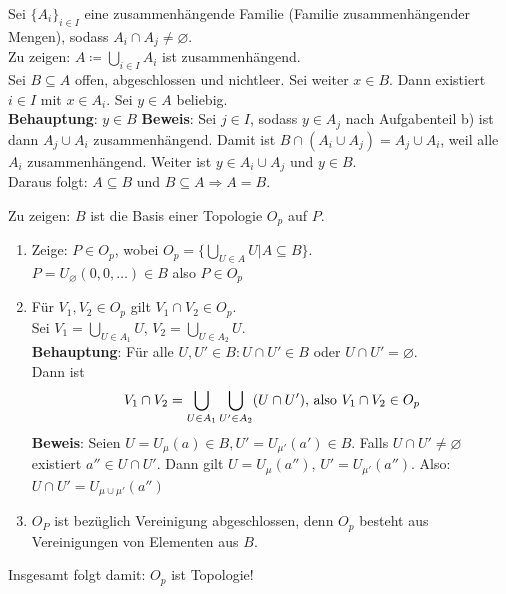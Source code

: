 \begin{problem*}[1c]
  Sei \( {\{ A_i \}}_{i \in I} \) eine zusammenhängende Familie (Familie zusammenhängender Mengen), sodass 
  \( A_i \cap A_j \neq \varnothing \). \\ 
  Zu zeigen: \( A \coloneqq \bigcup_{i \in I} A_i \) ist zusammenhängend. \\
  Sei \( B \subseteq A \) offen, abgeschlossen und nichtleer. Sei weiter \( x \in B \). Dann existiert \( i \in I \) mit
  \( x \in A_i \). Sei \( y \in A \) beliebig. \\
  \textbf{Behauptung}: \( y \in B \)
  \textbf{Beweis}: Sei \( j \in I \), sodass \( y \in A_j \) nach Aufgabenteil b) ist dann \( A_j \cup A_i \) zusammenhängend. Damit ist \( B \cap (A_i \cup A_j) = A_j \cup A_i \), weil alle \( A_i \) zusammenhängend.
  Weiter ist \( y \in A_i \cup A_j \) und \( y \in B \). \\
  Daraus folgt: \( A \subseteq B \) und \( B \subseteq A \Rightarrow A = B \).
\end{problem*}

\begin{problem*}[2a]
  Zu zeigen: \( B \) ist die Basis einer Topologie \( O_p \) auf \( P \).
  \begin{enumerate}
    \item Zeige: \( P \in O_p \), wobei \( O_p = \{ \bigcup_{U \in A} U | A \subseteq B \} \). \\
    \( P = U_{\varnothing} (0,0, \dots) \in B \) also \( P \in O_p \)
    \item Für \( V_1,V_2 \in O_p \) gilt \( V_1 \cap V_2 \in O_p \). \\
    Sei \( V_1 = \bigcup_{U \in A_1} U \), \( V_2 = \bigcup_{U \in A_2} U \). \\
    \textbf{Behauptung}: Für alle \( U,U' \in B: U \cap U' \in B \) oder \( U \cap U' = \varnothing \). \\
    Dann ist 
    \begin{equation*}
      V_1 \cap V_2 = \bigcup_{U \in A_1} \bigcup_{U' \in A_2} (U \cap U')\text{, also } V_1 \cap V_2 \in O_p \\
    \end{equation*}
    \textbf{Beweis}: Seien \( U = U_{\mu} (a) \in B , U' = U_{\mu'} (a') \in B \). Falls \( U \cap U' \neq \varnothing \) existiert \( a'' \in U \cap U' \). Dann gilt \( U = U_{\mu}(a'') \), \( U' = U_{\mu'}(a'') \). Also: \\
    \( U \cap U' = U_{\mu \cup \mu'} (a'') \)
    \item \( O_P \) ist bezüglich Vereinigung abgeschlossen, denn \( O_p \) besteht aus Vereinigungen von Elementen aus \( B \). \\
  \end{enumerate}
  Insgesamt folgt damit: \( O_p \) ist Topologie! 
\end{problem*}

